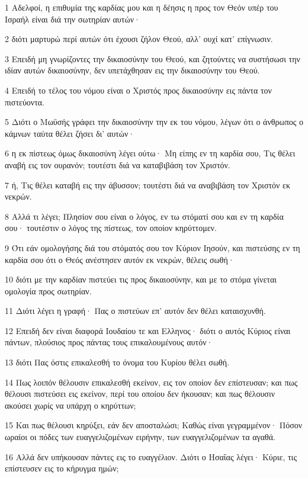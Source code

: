 \par 1 Αδελφοί, η επιθυμία της καρδίας μου και η δέησις η προς τον Θεόν υπέρ του Ισραήλ είναι διά την σωτηρίαν αυτών·
\par 2 διότι μαρτυρώ περί αυτών ότι έχουσι ζήλον Θεού, αλλ' ουχί κατ' επίγνωσιν.
\par 3 Επειδή μη γνωρίζοντες την δικαιοσύνην του Θεού, και ζητούντες να συστήσωσι την ιδίαν αυτών δικαιοσύνην, δεν υπετάχθησαν εις την δικαιοσύνην του Θεού.
\par 4 Επειδή το τέλος του νόμου είναι ο Χριστός προς δικαιοσύνην εις πάντα τον πιστεύοντα.
\par 5 Διότι ο Μωϋσής γράφει την δικαιοσύνην την εκ του νόμου, λέγων ότι ο άνθρωπος ο κάμνων ταύτα θέλει ζήσει δι' αυτών·
\par 6 η εκ πίστεως όμως δικαιοσύνη λέγει ούτω· Μη είπης εν τη καρδία σου, Τις θέλει αναβή εις τον ουρανόν; τουτέστι διά να καταβιβάση τον Χριστόν.
\par 7 ή, Τις θέλει καταβή εις την άβυσσον; τουτέστι διά να αναβιβάση τον Χριστόν εκ νεκρών.
\par 8 Αλλά τι λέγει; Πλησίον σου είναι ο λόγος, εν τω στόματί σου και εν τη καρδία σου· τουτέστιν ο λόγος της πίστεως, τον οποίον κηρύττομεν.
\par 9 Ότι εάν ομολογήσης διά του στόματός σου τον Κύριον Ιησούν, και πιστεύσης εν τη καρδία σου ότι ο Θεός ανέστησεν αυτόν εκ νεκρών, θέλεις σωθή·
\par 10 διότι με την καρδίαν πιστεύει τις προς δικαιοσύνην, και με το στόμα γίνεται ομολογία προς σωτηρίαν.
\par 11 Διότι λέγει η γραφή· Πας ο πιστεύων επ' αυτόν δεν θέλει καταισχυνθή.
\par 12 Επειδή δεν είναι διαφορά Ιουδαίου τε και Ελληνος· διότι ο αυτός Κύριος είναι πάντων, πλούσιος προς πάντας τους επικαλουμένους αυτόν·
\par 13 διότι Πας όστις επικαλεσθή το όνομα του Κυρίου θέλει σωθή.
\par 14 Πως λοιπόν θέλουσιν επικαλεσθή εκείνον, εις τον οποίον δεν επίστευσαν; και πως θέλουσι πιστεύσει εις εκείνον, περί του οποίου δεν ήκουσαν; και πως θέλουσιν ακούσει χωρίς να υπάρχη ο κηρύττων;
\par 15 Και πως θέλουσι κηρύξει, εάν δεν αποσταλώσι; Καθώς είναι γεγραμμένον· Πόσον ωραίοι οι πόδες των ευαγγελιζομένων ειρήνην, των ευαγγελιζομένων τα αγαθά.
\par 16 Αλλά δεν υπήκουσαν πάντες εις το ευαγγέλιον. Διότι ο Ησαΐας λέγει· Κύριε, τις επίστευσεν εις το κήρυγμα ημών;
